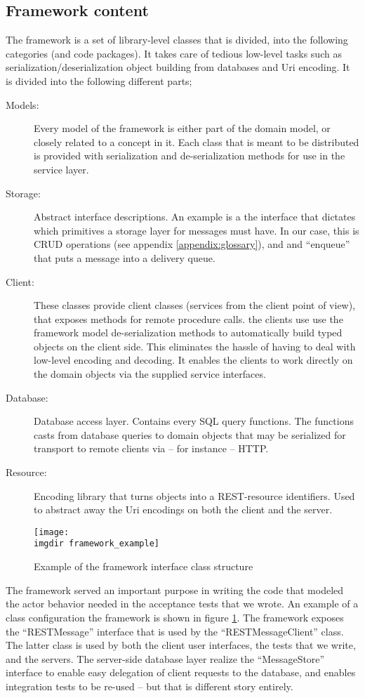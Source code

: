 \subsection{Framework content}
\label{ssec:openreception-framework-content}
\noindent
The framework is a set of library-level classes that is divided, into the following categories (and code packages). It takes care of tedious low-level tasks such as serialization/deserialization object building from databases and Uri encoding. It is divided into the following different parts;
\begin{description}
  \item[Models:] Every model of the framework is either part of the domain model, or closely related to a concept in it. Each class that is meant to be distributed is provided with serialization and de-serialization methods for use in the service layer.
  \item[Storage:] Abstract interface descriptions. An example is a the interface that dictates which primitives a storage layer for messages must have. In our case, this is CRUD operations (see appendix \ref{appendix:glossary}), and and ``enqueue'' that puts a message into a delivery queue.
  \item[Client:] These classes provide client classes (services from the client point of view), that exposes methods for remote procedure calls. the clients use  use the framework model de-serialization methods to automatically build typed objects on the client side. This eliminates the hassle of having to deal with low-level encoding and decoding. It enables the clients to work directly on the domain objects via the supplied service interfaces.
  \item[Database:] Database access layer. Contains every SQL query functions. The functions casts from database queries to domain objects that may be serialized for transport to remote clients via -- for instance -- HTTP.
  \item[Resource:] Encoding library that turns objects into a REST-resource identifiers. Used to abstract away the Uri encodings on both the client and the server.
\end{description}
\begin{figure}[!htbp]
\texttt{[image: \\imgdir framework\_example]}
\centering
\caption{Example of the framework interface class structure}
\label{fig:framework_example}
\end{figure}
\noindent The framework served an important purpose in writing the code that modeled the actor behavior needed in the acceptance tests that we wrote. An example of a class configuration the framework is shown in figure \ref{fig:framework_example}. The framework exposes the ``RESTMessage'' interface that is used by the ``RESTMessageClient'' class. The latter class is used by both the client user interfaces, the tests that we write, and the servers. The server-side database layer realize the ``MessageStore'' interface to enable easy delegation of client requests to the database, and enables integration tests to be re-used -- but that is different story entirely.

